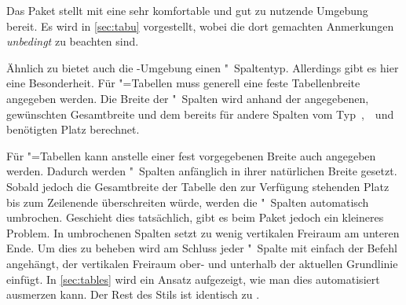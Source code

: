 \documentclass[%
  english,ngerman,%
  geometry=no,DIV=12,automark,%
]{tudscrartcl}
\begin{document}
Das Paket  stellt mit  eine sehr komfortable 
und gut zu nutzende Umgebung bereit. Es wird in \autoref{sec:tabu} vorgestellt, 
wobei die dort gemachten Anmerkungen \emph{unbedingt} zu beachten sind. 

Ähnlich zu  bietet auch die -Umgebung 
einen "~Spaltentyp. Allerdings gibt es hier eine Besonderheit. Für 
"=Tabellen muss generell eine feste Tabellenbreite 
angegeben werden. Die Breite der "~Spalten wird anhand der 
angegebenen, gewünschten Gesamtbreite und dem bereits für andere Spalten vom 
Typ~,~~und~ benötigten Platz berechnet. 

Für "=Tabellen kann anstelle einer fest vorgegebenen Breite 
auch  angegeben werden. Dadurch werden "~Spalten 
anfänglich in ihrer natürlichen Breite gesetzt. Sobald jedoch die Gesamtbreite 
der Tabelle den zur Verfügung stehenden Platz bis zum Zeilenende überschreiten 
würde, werden die "~Spalten automatisch umbrochen. Geschieht dies 
tatsächlich, gibt es beim Paket  jedoch ein kleineres Problem. 
In umbrochenen Spalten setzt  zu wenig vertikalen Freiraum am 
unteren Ende. Um dies zu beheben wird am Schluss jeder "~Spalte mit
 einfach der Befehl  angehängt, der 
vertikalen Freiraum ober- und unterhalb der aktuellen Grundlinie einfügt. In 
\autoref{sec:tables} wird ein Ansatz aufgezeigt, wie man dies automatisiert 
ausmerzen kann. Der Rest des Stils ist identisch zu .
%
\CodeHook{\let\newglossarystyle\renewglossarystyle}
\begin{Preamble*}

\end{Preamble*}
%
\begin{Hint}
\printacronyms[style=acrotabu]
\end{Hint}
\begin{quoting}[rightmargin=0pt]
\vspace*{-\baselineskip}
\glsdisablehyper
\InputCode
\end{quoting}
\end{document}
